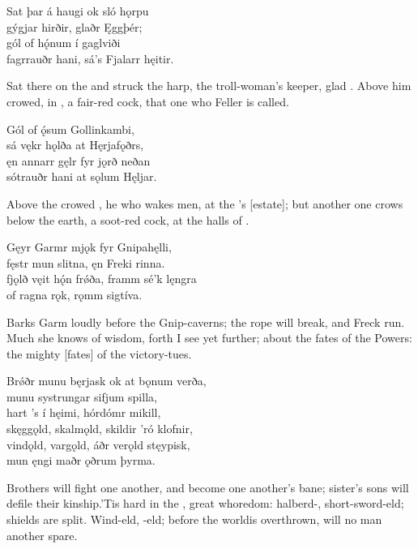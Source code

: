 \bva Sat þar á haugi \hld ok sló hǫrpu \\%
gýgjar hirðir, \hld glaðr Ęggþér; \\%
gól of hǫ́num \hld í gaglviði \\%
fagrrauðr hani, \hld sá’s Fjalarr hęitir.\eva

\bvb Sat there on the  and struck the harp, the troll-woman’s keeper, glad . Above him crowed, in , a fair-red cock, that one who Feller is called.\evb

\bva Gól of ǫ́sum \hld Gollinkambi, \\%
sá vękr hǫlða \hld at Hęrjafǫðrs, \\%
ęn annarr gęlr \hld fyr jǫrð neðan \\%
sótrauðr hani \hld at sǫlum Hęljar.\eva

\bvb Above the  crowed , he who wakes men, at the ’s [estate]; but another one crows below the earth, a soot-red cock, at the halls of .\footnotemark[1]\evb
{}

\bva Gęyr Garmr mjǫk \hld fyr Gnipahęlli, \\%
fęstr mun slitna, \hld ęn Freki rinna. \\%
fjǫlð vęit hǫ́n frǿða, \hld framm sé’k lęngra \\%
of ragna rǫk, \hld rǫmm sigtíva.\eva

\bvb Barks Garm loudly before the Gnip-caverns; the rope will break, and Freck run. Much she knows of wisdom, forth I see yet further; about the fates of the Powers: the mighty [fates] of the victory-tues.\evb

\bva Brǿðr munu bęrjask \hld ok at bǫnum verða, \\%
munu systrungar \hld sifjum spilla, \\%
hart ’s í hęimi, \hld hórdómr mikill, \\%
skęggǫld, skalmǫld, \hld skildir ’ró klofnir, \\%
vindǫld, vargǫld, \hld áðr verǫld stęypisk, \\%
mun ęngi maðr \hld ǫðrum þyrma.\eva

\bvb Brothers will fight one another, and become one another’s bane; sister’s sons will defile their kinship.\footnotemark[1] ’Tis hard in the , great whoredom: halberd-, short-sword-eld; shields are split. Wind-eld, -eld; before the world\footnotemark[2] is overthrown, will no man another spare.\evb
{}

